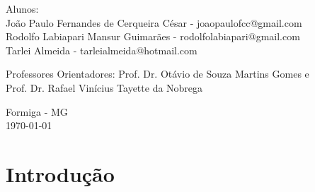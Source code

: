 \documentclass[portugues, brazil, a4paper,12pt]{article}
\begin{document}
\begin{titlepage}
  \vfill

  \begin{center}
    \begin{large}
      Alunos: \\
        João Paulo Fernandes de Cerqueira César - joaopaulofcc@gmail.com \\
		Rodolfo Labiapari Mansur Guimarães - rodolfolabiapari@gmail.com \\
		Tarlei Almeida - tarleialmeida@hotmail.com
    \end{large}
  \end{center}

\vfill

  \begin{center}
    \begin{large}
      Professores Orientadores: Prof. Dr. Otávio de Souza Martins Gomes e \\ Prof. Dr. Rafael Vinícius Tayette da Nobrega
    \end{large}
  \end{center}

\vfill

  \begin{center}
    \begin{large}
      Formiga - MG \\
      \today \\
    \end{large}
  \end{center}

\clearpage
\tableofcontents 
\end{titlepage}


\newpage
\section{Introdução}





\end{document}
